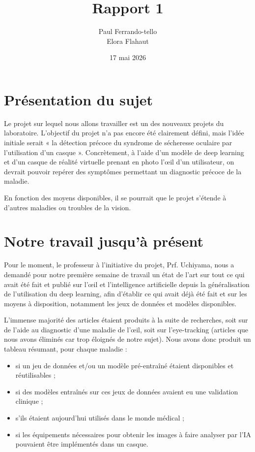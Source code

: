 \documentclass[12pt,a4paper]{article}
\title{Rapport 1}
\author{Paul Ferrando-tello \\ Elora Flahaut}
\date{17 mai 2026}
\begin{document}
\maketitle

\section*{Présentation du sujet}
Le projet sur lequel nous allons travailler est un des nouveaux projets du laboratoire. L'objectif du projet n'a pas encore été clairement défini, mais l'idée initiale serait « la détection précoce du syndrome de sécheresse oculaire par l'utilisation d'un casque ». Concrètement, à l'aide d'un modèle de deep learning et d'un casque de réalité virtuelle prenant en photo l'œil d'un utilisateur, on devrait pouvoir repérer des symptômes permettant un diagnostic précoce de la maladie.

\vspace{0.5cm}

En fonction des moyens disponibles, il se pourrait que le projet s'étende à d'autres maladies ou troubles de la vision.

\section*{Notre travail jusqu'à présent}
Pour le moment, le professeur à l'initiative du projet, Prf. Uchiyama, nous a demandé pour notre première semaine de travail un état de l'art sur tout ce qui avait été fait et publié sur l'œil et l'intelligence artificielle depuis la généralisation de l'utilisation du deep learning, afin d'établir ce qui avait déjà été fait et sur les moyens à disposition, notamment les jeux de données et modèles disponibles.

\vspace{0.5cm}

L'immense majorité des articles étaient produits à la suite de recherches, soit sur de l'aide au diagnostic d'une maladie de l'œil, soit sur l'eye-tracking (articles que nous avons éliminés car trop éloignés de notre sujet). Nous avons donc produit un tableau résumant, pour chaque maladie :
\begin{itemize}
\item si un jeu de données et/ou un modèle pré-entraîné étaient disponibles et réutilisables ;
\item si des modèles entraînés sur ces jeux de données avaient eu une validation clinique ;
\item s'ils étaient aujourd'hui utilisés dans le monde médical ;
\item si les équipements nécessaires pour obtenir les images à faire analyser par l'IA pouvaient être implémentés dans un casque.
\end{itemize}
\end{document}
